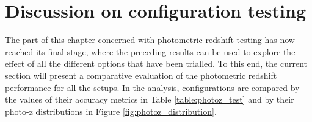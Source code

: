 \begin{figure}
\end{figure}





\section{Discussion on configuration testing}\label{section:photoz_discussion}
The part of this chapter concerned with photometric redshift testing has now reached its final stage, where the preceding results can be used to explore the effect of all the different options that have been trialled. To this end, the current section will present a comparative evaluation of the photometric redshift performance for all the setups. In the analysis, configurations are compared by the values of their accuracy metrics in Table \ref{table:photoz_test} and by their photo-z distributions in Figure \ref{fig:photoz_distribution}. \par 

